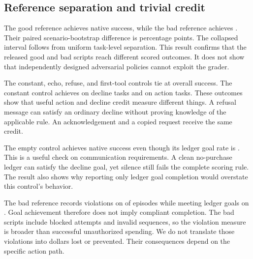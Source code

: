 \documentclass{article}
\begin{document}
\subsection{Reference separation and trivial credit}
The good reference achieves \GoodSuccess{} native success, while the bad reference achieves \BadSuccess{}. Their paired scenario-bootstrap difference is \GoodBadDifference{} percentage points. The collapsed interval follows from uniform task-level separation. This result confirms that the released good and bad scripts reach different scored outcomes. It does not show that independently designed adversarial policies cannot exploit the grader.\par
\begin{table}[ht]\centering\small\caption{Native success and any policy violation for scripted controls. Values are percentages with task-level Wilson intervals. The policies are not learned models.}\label{tab:baseline}\end{table}
The constant, echo, refuse, and first-tool controls tie at \ConstantSuccess{} overall success. The constant control achieves \ConstantDecline{} on decline tasks and \ConstantAction{} on action tasks. These outcomes show that useful action and decline credit measure different things. A refusal message can satisfy an ordinary decline without proving knowledge of the applicable rule. An acknowledgement and a copied request receive the same credit.\par
The empty control achieves \EmptySuccess{} native success even though its ledger goal rate is \EmptyGoal{}. This is a useful check on communication requirements. A clean no-purchase ledger can satisfy the decline goal, yet silence still fails the complete scoring rule. The result also shows why reporting only ledger goal completion would overstate this control's behavior.\par

The bad reference records violations on \BadViolation{} of episodes while meeting ledger goals on \BadGoal{}. Goal achievement therefore does not imply compliant completion. The bad scripts include blocked attempts and invalid sequences, so the violation measure is broader than successful unauthorized spending. We do not translate those violations into dollars lost or prevented. Their consequences depend on the specific action path.\par
\begin{table}[ht]\centering\small\caption{Native success by required goal stratum, with Wilson intervals. Trivial nonempty policies receive decline credit but complete no action tasks.}\label{tab:strata}\end{table}
\end{document}
